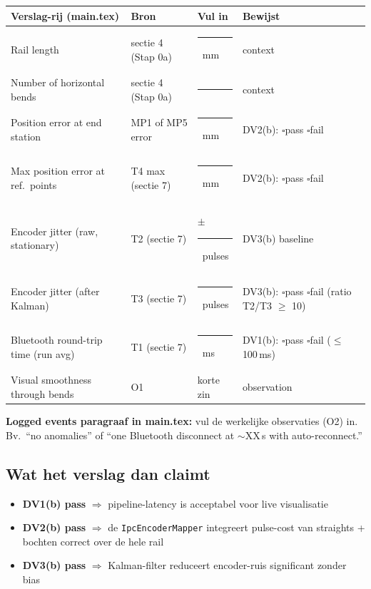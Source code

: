 \documentclass[11pt, a4paper]{article}
\newcommand{\cbox}{$\square$\;}
\newcommand{\fillshort}{\rule[-0.5ex]{2cm}{0.4pt}}
\begin{document}
\renewcommand{\arraystretch}{1.6}
\begin{tabular}{@{}|p{4.7cm}|p{1.8cm}|p{2.2cm}|p{4.5cm}|@{}}
\hline
\textbf{Verslag-rij (main.tex)} & \textbf{Bron} & \textbf{Vul in} & \textbf{Bewijst} \\ \hline
Rail length & sectie 4 (Stap 0a) & \fillshort\ mm & context \\ \hline
Number of horizontal bends & sectie 4 (Stap 0a) & \fillshort & context \\ \hline
Position error at end station & MP1 of MP5 error & \fillshort\ mm & DV2(b): \cbox pass \cbox fail \\ \hline
Max position error at ref.\ points & T4 max (sectie 7) & \fillshort\ mm & DV2(b): \cbox pass \cbox fail \\ \hline
Encoder jitter (raw, stationary) & T2 (sectie 7) & $\pm$\fillshort\ pulses & DV3(b) baseline \\ \hline
Encoder jitter (after Kalman) & T3 (sectie 7) & \fillshort\ pulses & DV3(b): \cbox pass \cbox fail (ratio T2/T3 $\geq$ 10) \\ \hline
Bluetooth round-trip time (run avg) & T1 (sectie 7) & \fillshort\ ms & DV1(b): \cbox pass \cbox fail ($\leq$ 100\,ms) \\ \hline
Visual smoothness through bends & O1 & korte zin & observation \\ \hline
\end{tabular}
\renewcommand{\arraystretch}{1.0}

\textbf{Logged events paragraaf in main.tex:} vul de werkelijke
observaties (O2) in. Bv.\ ``no anomalies'' of ``one Bluetooth disconnect
at $\sim$XX\,s with auto-reconnect.''

\subsection{Wat het verslag dan claimt}

\begin{itemize}[leftmargin=2em, label=$\bullet$]
  \item \textbf{DV1(b) pass} $\Rightarrow$ pipeline-latency is acceptabel
        voor live visualisatie
  \item \textbf{DV2(b) pass} $\Rightarrow$ de \texttt{IpcEncoderMapper}
        integreert pulse-cost van straights + bochten correct over de
        hele rail
  \item \textbf{DV3(b) pass} $\Rightarrow$ Kalman-filter reduceert
        encoder-ruis significant zonder bias
\end{itemize}
\end{document}
